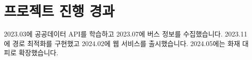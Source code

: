 \section{프로젝트 진행 경과}

2023.03에 공공데이터 API를 학습하고 2023.07에 버스 정보를 수집했습니다. 2023.11에 경로 최적화를 구현했고 2024.02에 웹 서비스를 출시했습니다. 2024.05에는 화재 대피로 확장했습니다.

